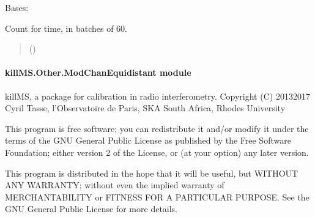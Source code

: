\documentclass[letterpaper,10pt,english]{sphinxmanual}
\begin{document}
\begin{fulllineitems}
\label{\detokenize{api/killMS.Other:killMS.Other.Counter.CounterTime}}
\pysigstartsignatures
{}
\pysigstopsignatures
\sphinxAtStartPar
Bases: 

\sphinxAtStartPar
Count for time, in batches of 60.
\begin{quote}\begin{description}
\sphinxAtStartPar
{} () \textendash{} 

\end{description}\end{quote}

\end{fulllineitems}



\paragraph{killMS.Other.ModChanEquidistant module}
\label{\detokenize{api/killMS.Other:module-killMS.Other.ModChanEquidistant}}\label{\detokenize{api/killMS.Other:killms-other-modchanequidistant-module}}
\sphinxAtStartPar
killMS, a package for calibration in radio interferometry.
Copyright (C) 2013\sphinxhyphen{}2017  Cyril Tasse, l’Observatoire de Paris,
SKA South Africa, Rhodes University

\sphinxAtStartPar
This program is free software; you can redistribute it and/or
modify it under the terms of the GNU General Public License
as published by the Free Software Foundation; either version 2
of the License, or (at your option) any later version.

\sphinxAtStartPar
This program is distributed in the hope that it will be useful,
but WITHOUT ANY WARRANTY; without even the implied warranty of
MERCHANTABILITY or FITNESS FOR A PARTICULAR PURPOSE.  See the
GNU General Public License for more details.
\end{document}
